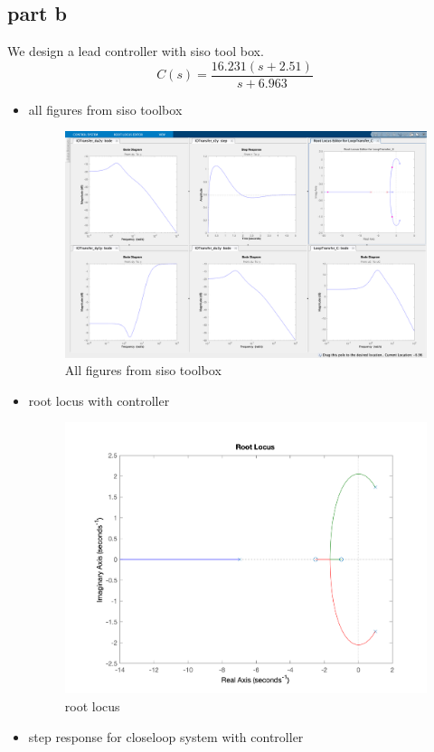 \subsection{part b}
We design a lead controller with siso tool box.
$$
C(s) = \dfrac{16.231(s + 2.51)}{s + 6.963}
$$
\begin{itemize}
	\item all figures from siso toolbox
	\begin{figure}[H]
		\caption{All figures from siso toolbox}
		\centering
		\includegraphics[width=16cm]{../Figure/Q1/Q1_b/siso_all.png}
	\end{figure}
	\newpage
	\item root locus with controller
	\begin{figure}[H]
		\caption{root locus}
		\centering
		\includegraphics[width=12cm]{../Figure/Q1/Q1_b/rlocus.png}
	\end{figure}
	\item step response for closeloop system with controller

\end{itemize}
